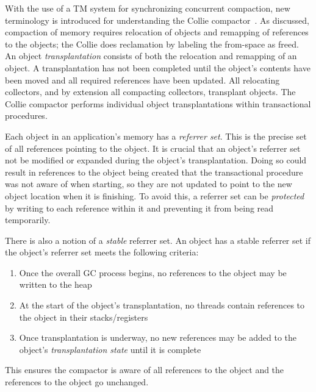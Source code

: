 \documentclass{sig-alternate}
\begin{document}
With the use of a TM system for synchronizing concurrent compaction,
new terminology is introduced for understanding the Collie 
compactor~\cite{Iyengar:Collie}. As discussed, compaction of
memory requires relocation of objects and remapping of references to
the objects; the Collie does reclamation by labeling the from-space as freed.
An object \emph{transplantation} consists of both the relocation and 
remapping of an object. A transplantation has not been completed until
the object's contents have been moved and all required references have been
updated. All relocating collectors, and by extension all
compacting collectors, transplant objects. The Collie compactor 
performs individual object transplantations within transactional procedures. 

Each object in an application's memory has a \emph{referrer set}. This is the precise set 
of all references pointing to the object. It is crucial that an object's referrer set not
be modified or expanded during the object's transplantation. Doing so could result
in references to the object being created that the transactional procedure
was not aware of when starting, so they are not updated to point to 
the new object location when it is finishing. To avoid this, a referrer set can be
\emph{protected} by writing to each reference within it and preventing it from
being read temporarily.

There is also a notion of a \emph{stable} referrer set. An object has a stable referrer 
set if the object's referrer set meets the following criteria:
\begin{enumerate}
\item Once the overall GC process begins, no references to the object may be written to the heap
\item At the start of the object's transplantation, no threads contain references to the object in their stacks/registers
\item Once transplantation is underway, no new references may be added to the object's \emph{transplantation state} until it is complete
\end{enumerate}
This ensures the compactor is aware of all references to the object
and the references to the object go unchanged.
\end{document}
